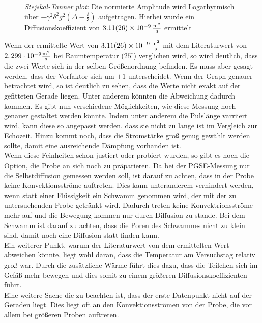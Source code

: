 \begin{figure}[H]
    \centering
    
    \caption[Bestimmung des selbst Diffusionskoeffizienten mithilfe von dem Stejskal-Tanner plot]{\textit{Stejskal-Tanner plot}: Die normierte Amplitude wird Logarhytmisch über $-\gamma^2\delta^2g^2\left(\Delta-\frac{\delta}{3}\right)$ aufgetragen. Hierbei wurde ein Diffusionskoeffizient von $\SI{3,11(26)e-9}{\frac{\m^2}{s}}$ ermittelt}
\end{figure}
 Wenn der ermittelte Wert von $\SI{3,11(26)e-9}{\frac{\m^2}{s}}$ mit dem Literaturwert von $2,299 \cdot 10^{-9}\si{\frac{\m^2}{\s}}$ bei Raumtemperatur ($25^{\circ}$) verglichen wird\cite{Diff}, so wird deutlich, dass die zwei Werte sich in der selben Größenordnung befinden. Es muss aber gesagt werden, dass der Vorfaktor sich um $\pm 1$ unterscheidet. Wenn der Graph  genauer betrachtet wird, so ist deutlich zu sehen, dass die Werte nicht exakt auf der gefitteten Gerade liegen. Unter anderem könnten die Abweichung dadurch kommen. 
Es gibt nun verschiedene Möglichkeiten, wie diese Messung noch genauer gestaltet werden könnte. Indem unter anderem die Pulslänge varriiert wird, kann diese so angepasst werden, dass sie nicht zu lange ist im Vergleich zur Echozeit. Hinzu kommt noch, dass die Stromstärke groß genug gewählt werden sollte, damit eine ausreichende Dämpfung vorhanden ist.\\
Wenn diese Feinheiten schon justiert oder probiert wurden, so gibt es noch die Option, die Probe an sich noch zu präparieren. Da bei der PGSE-Messung nur die Selbstdiffusion gemessen werden soll, ist darauf zu achten, dass in der Probe keine Konvektionsströme auftreten. Dies kann unteranderem verhindert werden, wenn statt einer Flüssigkeit ein Schwamm genommen wird, der mit der zu untersuchenden Probe getränkt wird. Dadurch treten keine Konvektrionsströme mehr auf und die Bewegung kommen nur durch Diffusion zu stande. Bei dem Schwamm ist darauf zu achten, dass die Poren des Schwammes nicht zu klein sind, damit noch eine Diffusion statt finden kann.\\
Ein weiterer Punkt, warum der Literaturwert von dem ermittelten Wert abweichen könnte, liegt wohl daran, dass die Temperatur am Versuchstag relativ groß war. Durch die zusätzliche Wärme führt dies dazu, dass die Teilchen sich im Gefäß mehr bewegen und dies somit zu einem größeren Diffusionskoeffizienten führt.\\
Eine weitere Sache die zu beachten ist, dass der erste Datenpunkt nicht auf der Geraden liegt. Dies liegt oft an den Konvektionsströmen von der Probe, die vor allem bei größeren Proben auftreten.